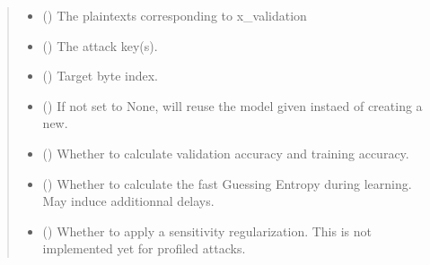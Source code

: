 \documentclass[letterpaper,10pt,english]{sphinxmanual}
\begin{document}
\begin{fulllineitems}
\begin{fulllineitems}
\begin{quote}
\begin{description}
\begin{itemize}
\item {} 
\sphinxAtStartPar
{}\sphinxstyleliteralstrong{\sphinxupquote{{[}}}\sphinxstyleliteralstrong{\sphinxupquote{{]}}} () \textendash{} The plaintexts corresponding to x\_validation

\item {} 
\sphinxAtStartPar
{} (\sphinxstyleliteralemphasis{\sphinxupquote{{[}}}\sphinxstyleliteralemphasis{\sphinxupquote{{[}}}\sphinxstyleliteralemphasis{\sphinxupquote{{]}}}\sphinxstyleliteralemphasis{\sphinxupquote{{]}}}) \textendash{} The attack key(s).

\item {} 
\sphinxAtStartPar
{} () \textendash{} Target byte index.

\item {} 
\sphinxAtStartPar
{} (\sphinxstyleliteralemphasis{\sphinxupquote{, }}) \textendash{} If not set to None, will re\sphinxhyphen{}use the model given instaed of creating a new.

\item {} 
\sphinxAtStartPar
{} (\sphinxstyleliteralemphasis{\sphinxupquote{, }}) \textendash{} Whether to calculate validation accuracy and training accuracy.

\item {} 
\sphinxAtStartPar
{} (\sphinxstyleliteralemphasis{\sphinxupquote{, }}) \textendash{} Whether to calculate the fast Guessing Entropy during learning. May induce
additionnal delays.

\item {} 
\sphinxAtStartPar
{} (\sphinxstyleliteralemphasis{\sphinxupquote{, }}) \textendash{} Whether to apply a sensitivity regularization. This is not implemented yet
for profiled attacks.


\end{itemize}
\end{description}
\end{quote}
\end{fulllineitems}
\end{fulllineitems}
\end{document}
